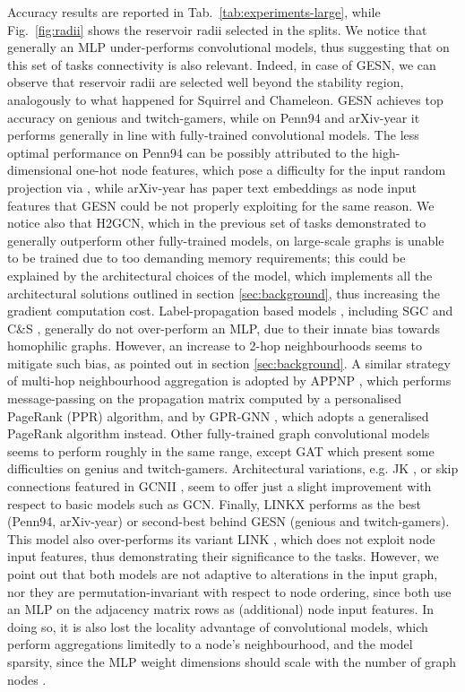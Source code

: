 \documentclass[final,5p,times,twocolumn]{elsarticle}
\begin{document}
Accuracy results are reported in Tab.~\ref{tab:experiments-large}, while Fig.~\ref{fig:radii} shows the reservoir radii selected in the  splits.
We notice that generally an MLP under-performs convolutional models, thus suggesting that on this set of tasks connectivity is also relevant.
Indeed, in case of GESN, we can observe that reservoir radii are selected well beyond the stability region, analogously to what happened for Squirrel and Chameleon.
GESN achieves top accuracy on genious and twitch-gamers, while on Penn94 and arXiv-year it performs generally in line with fully-trained convolutional models.
The less optimal performance on Penn94 can be possibly attributed to the high-dimensional one-hot node features, which pose a difficulty for the input random projection via , while arXiv-year has paper text embeddings as node input features that GESN could be not properly exploiting for the same reason.
We notice also that H2GCN, which in the previous set of tasks demonstrated to generally outperform other fully-trained models, on large-scale graphs is unable to be trained due to too demanding memory requirements; this could be explained by the architectural choices of the model, which implements all the architectural solutions outlined in section \ref{sec:background}, thus increasing the gradient computation cost.
Label-propagation based models \cite{Zhou2004}, including SGC \cite{Wu2019} and C\&S \cite{Huang2021}, generally do not over-perform an MLP, due to their innate bias towards homophilic graphs.
However, an increase to 2-hop neighbourhoods seems to mitigate such bias, as pointed out in section \ref{sec:background}.
A similar strategy of multi-hop neighbourhood aggregation is adopted by APPNP \cite{Klicpera2019}, which performs message-passing on the propagation matrix computed by a personalised PageRank (PPR) algorithm, and by GPR-GNN \cite{Chien2021}, which adopts a generalised PageRank algorithm instead.
Other fully-trained graph convolutional models seems to perform roughly in the same range, except GAT \cite{Velickovic2018} which present some difficulties on genius and twitch-gamers.
Architectural variations, e.g. JK \cite{Xu2018}, or skip connections featured in GCNII \cite{ChenMing2020}, seem to offer just a slight improvement with respect to basic models such as GCN.
Finally, LINKX \cite{Lim2021} performs as the best (Penn94, arXiv-year) or second-best behind GESN (genious and twitch-gamers).
This model also over-performs its variant LINK \cite{Zheleva2009}, which does not exploit node input features, thus demonstrating their significance to the tasks.
However, we point out that both models are not adaptive to alterations in the input graph, nor they are permutation-invariant with respect to node ordering, since both use an MLP on the adjacency matrix rows as (additional) node input features.
In doing so, it is also lost the locality advantage of convolutional models, which perform aggregations limitedly to a node's neighbourhood, and the model sparsity, since the MLP weight dimensions should scale with the number of graph nodes .
\end{document}
